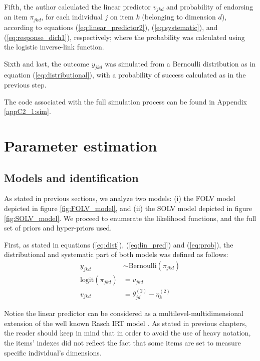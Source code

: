Fifth, the author calculated the linear predictor $v_{jkd}$ and probability of endorsing an item $\pi_{jkd}$, for each individual $j$ on item $k$ (belonging to dimension $d$), according to equations (\ref{eq:linear_predictor2}), (\ref{eq:systematic}), and (\ref{eq:response_dich1}), respectively; where the probability was calculated using the logistic inverse-link function.
	
Sixth and last, the outcome $y_{jkd}$ was simulated from a Bernoulli distribution as in equation (\ref{eq:distributional}), with a probability of success calculated as in the previous step.

The code associated with the full simulation process can be found in Appendix \ref{appC2_1:sim}.


\section{Parameter estimation}

\subsection{Models and identification}

As stated in previous sections, we analyze two models: (i) the FOLV model depicted in figure \ref{fig:FOLV_model}, and (ii) the SOLV model depicted in figure \ref{fig:SOLV_model}. We proceed to enumerate the likelihood functions, and the full set of priors and hyper-priors used. 

First, as stated in equations (\ref{eq:dist}), (\ref{eq:lin_pred}) and (\ref{eq:prob}), the distributional and systematic part of both models was defined as follows:
%
\begin{align}
	y_{jkd} &\sim \text{Bernoulli}( \pi_{jkd} ) \\
	\text{logit}( \pi_{jkd} ) &= v_{jkd} \\
	v_{jkd} &= \theta^{(2)}_{jd} - \eta^{(2)}_{k}
\end{align}

Notice the linear predictor can be considered as a multilevel-multidimensional extension of the well known Rasch IRT model \cite{Rasch_1980}. As stated in previous chapters, the reader should keep in mind that in order to avoid the use of heavy notation, the items' indexes did not reflect the fact that some items are set to measure specific individual's dimensions. 

